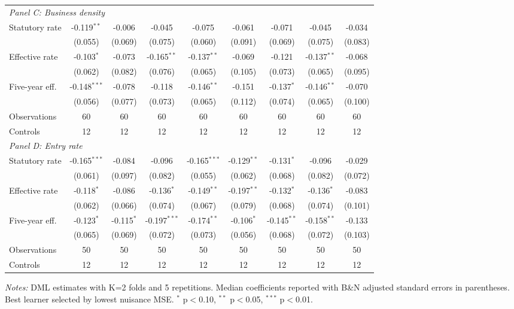 \begin{table}[htbp]
\begin{tabular}{lcccccccc}
\midrule
\multicolumn{9}{l}{\textit{Panel C: Business density}} \\
Statutory rate & -0.119$^{**}$ & -0.006 & -0.045 & -0.075 & -0.061 & -0.071 & -0.045 & -0.034 \\
 & (0.055) & (0.069) & (0.075) & (0.060) & (0.091) & (0.069) & (0.075) & (0.083) \\
Effective rate & -0.103$^{*}$ & -0.073 & -0.165$^{**}$ & -0.137$^{**}$ & -0.069 & -0.121 & -0.137$^{**}$ & -0.068 \\
 & (0.062) & (0.082) & (0.076) & (0.065) & (0.105) & (0.073) & (0.065) & (0.095) \\
Five-year eff. & -0.148$^{***}$ & -0.078 & -0.118 & -0.146$^{**}$ & -0.151 & -0.137$^{*}$ & -0.146$^{**}$ & -0.070 \\
 & (0.056) & (0.077) & (0.073) & (0.065) & (0.112) & (0.074) & (0.065) & (0.100) \\
Observations & 60 & 60 & 60 & 60 & 60 & 60 & 60 & 60 \\
Controls & 12 & 12 & 12 & 12 & 12 & 12 & 12 & 12 \\
\midrule
\multicolumn{9}{l}{\textit{Panel D: Entry rate}} \\
Statutory rate & -0.165$^{***}$ & -0.084 & -0.096 & -0.165$^{***}$ & -0.129$^{**}$ & -0.131$^{*}$ & -0.096 & -0.029 \\
 & (0.061) & (0.097) & (0.082) & (0.055) & (0.062) & (0.068) & (0.082) & (0.072) \\
Effective rate & -0.118$^{*}$ & -0.086 & -0.136$^{*}$ & -0.149$^{**}$ & -0.197$^{**}$ & -0.132$^{*}$ & -0.136$^{*}$ & -0.083 \\
 & (0.062) & (0.066) & (0.074) & (0.067) & (0.079) & (0.068) & (0.074) & (0.101) \\
Five-year eff. & -0.123$^{*}$ & -0.115$^{*}$ & -0.197$^{***}$ & -0.174$^{**}$ & -0.106$^{*}$ & -0.145$^{**}$ & -0.158$^{**}$ & -0.133 \\
 & (0.065) & (0.069) & (0.072) & (0.073) & (0.056) & (0.068) & (0.072) & (0.103) \\
Observations & 50 & 50 & 50 & 50 & 50 & 50 & 50 & 50 \\
Controls & 12 & 12 & 12 & 12 & 12 & 12 & 12 & 12 \\
\bottomrule
\end{tabular}
\begin{minipage}{0.95\textwidth}
\vspace{2mm}\footnotesize
\textit{Notes:} DML estimates with K=2 folds and 5 repetitions. 
Median coefficients reported with B\&N adjusted standard errors in parentheses. 
Best learner selected by lowest nuisance MSE. 
$^{*}$ p$<$0.10, $^{**}$ p$<$0.05, $^{***}$ p$<$0.01.
\end{minipage}
\end{table}